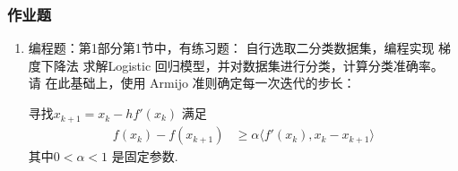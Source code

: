 \documentclass[handout]{beamer}
\begin{document}
\begin{frame}
	\frametitle{作业题} 
	
	
	\begin{enumerate}
 
		\item 编程题：第1部分第1节中，有练习题： 自行选取二分类数据集，编程实现 梯度下降法 求解Logistic 回归模型，并对数据集进行分类，计算分类准确率。
		请 在此基础上，使用  Armijo 准则确定每一次迭代的步长： 
		
		
		
	 
	  寻找$x_{k+1}^{} = x_{k}^{} - h f'(x_k)$ 满足
		\begin{align}
			f(x_k) - f(x_{k+1}) & \geq \alpha \langle f'(x_k), x_k - x_{k+1}^{} \rangle \label{EQ_1_2_10} 
		\end{align}
		其中$0<\alpha  < 1$ 是固定参数.
		
		
		
		
		
		
		
	\end{enumerate}
	
	
\end{frame}
\end{document}
